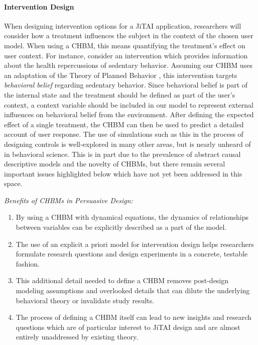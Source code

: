 \documentclass[runningheads,a4paper]{llncs}
\begin{document}

\paragraph{Intervention Design}
When designing intervention options for a JiTAI application, researchers will consider how a treatment influences the subject in the context of the chosen user model.
When using a CHBM, this means quantifying the treatment's effect on user context.
For instance, consider an intervention which provides information about the health repercussions of sedentary behavior.
Assuming our CHBM uses an adaptation of the Theory of Planned Behavior \cite{Ajzen1991theory}, this intervention targets \emph{behavioral belief} regarding sedentary behavior.
Since behavioral belief is part of the internal state and the treatment should be defined as part of the user's context, a context variable should be included in our model to represent external influences on behavioral belief from the environment.
After defining the expected effect of a single treatment, the CHBM can then be used to predict a detailed account of user response.
The use of simulations such as this in the process of designing controls is well-explored in many other areas, but is nearly unheard of in behavioral science.
This is in part due to the prevalence of abstract causal descriptive models and the novelty of CHBMs, but there remain several important issues highlighted below which have not yet been addressed in this space.

\emph{Benefits of CHBMs in Persuasive Design:}
\begin{enumerate}
    \item By using a CHBM with dynamical equations, the dynamics of relationships between variables can be explicitly described as a part of the model.
    \item The use of an explicit a priori model for intervention design helps researchers formulate research questions and design experiments in a concrete, testable fashion.
    \item This additional detail needed to define a CHBM removes post-design modeling assumptions and overlooked details that can dilute the underlying behavioral theory or invalidate study results.
    \item The process of defining a CHBM itself can lead to new insights and research questions which are of particular interest to JiTAI design and are almost entirely unaddressed by existing theory.
\end{enumerate}
\end{document}
